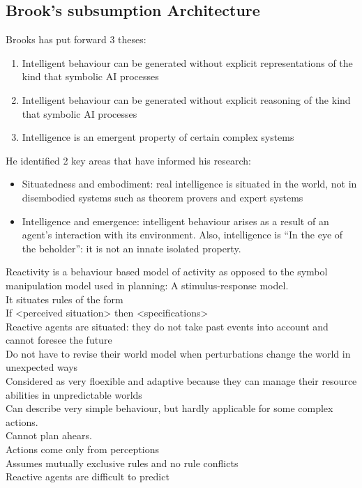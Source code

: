 \subsection{Brook's subsumption Architecture}
Brooks has put forward 3 theses:
\begin{enumerate}
\item Intelligent behaviour can be generated without explicit representations of the kind that symbolic AI processes
\item Intelligent behaviour can be generated without explicit reasoning of the kind that symbolic AI processes
\item Intelligence is an emergent property of certain complex systems
\end{enumerate}

He identified 2 key areas that have informed his research:
\begin{itemize}
\item Situatedness and embodiment: real intelligence is situated in the world, not in disembodied systems such as theorem provers and expert systems
\item Intelligence and emergence: intelligent behaviour arises as a result of an agent's interaction with its environment. Also, intelligence is ``In the eye of the beholder'': it is not an innate isolated property.
\end{itemize}

Reactivity is a behaviour based model of activity as opposed to the symbol manipulation model used in planning: A stimulus-response model.\\
It situates rules of the form\\
If <perceived situation> then <specifications>\\
Reactive agents are situated: they do not take past events into account and cannot foresee the future\\
Do not have to revise their world model when perturbations change the world in unexpected ways\\
Considered as very floexible and adaptive because they can manage their resource abilities in unpredictable worlds\\

Can describe very simple behaviour, but hardly applicable for some complex actions.\\
Cannot plan ahears.\\
Actions come only from perceptions\\
Assumes mutually exclusive rules and no rule conflicts\\
Reactive agents are difficult to predict

